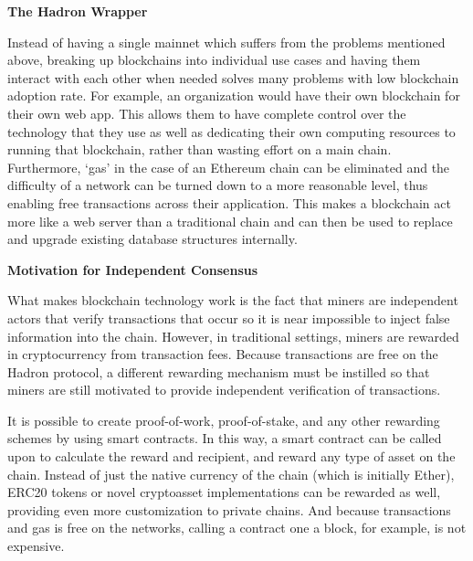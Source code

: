 \documentclass{%
	article}
\begin{document}
\begin{center}
\textbf{The Hadron Wrapper}
\end{center}

Instead of having a single mainnet which suffers from the problems mentioned above, breaking up blockchains into individual use cases and having them interact with each other when needed solves many problems with low blockchain adoption rate. For example, an organization would have their own blockchain for their own web app. This allows them to have complete control over the technology that they use as well as dedicating their own computing resources to running that blockchain, rather than wasting effort on a main chain. Furthermore, ‘gas’ in the case of an Ethereum chain can be eliminated and the difficulty of a network can be turned down to a more reasonable level, thus enabling free transactions across their application. This makes a blockchain act more like a web server than a traditional chain and can then be used to replace and upgrade existing database structures internally.

\begin{center}
\textbf{Motivation for Independent Consensus}
\end{center}

What makes blockchain technology work is the fact that miners are independent actors that verify transactions that occur so it is near impossible to inject false information into the chain. However, in traditional settings, miners are rewarded in cryptocurrency from transaction fees. Because transactions are free on the Hadron protocol, a different rewarding mechanism must be instilled so that miners are still motivated to provide independent verification of transactions.

It is possible to create proof-of-work, proof-of-stake, and any other rewarding schemes by using smart contracts. In this way, a smart contract can be called upon to calculate the reward and recipient, and reward any type of asset on the chain. Instead of just the native currency of the chain (which is initially Ether), ERC20 tokens or novel cryptoasset implementations can be rewarded as well, providing even more customization to private chains. And because transactions and gas is free on the networks, calling a contract one a block, for example, is not expensive.
\end{document}
